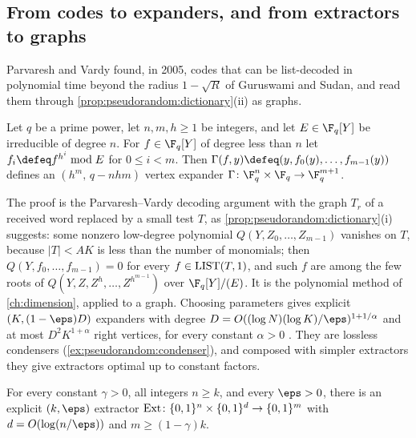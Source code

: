 \begin{refsection}
\subsection{From codes to expanders, and from extractors to graphs}\label{sec:pseudorandom:guv}

Parvaresh and Vardy found, in 2005, codes that can be list-decoded in polynomial time beyond the radius $1-\sqrt R$ of Guruswami and Sudan, and \textcite{GuruswamiUmansVadhan2009} read them through \cref{prop:pseudorandom:dictionary}(ii) as graphs.

\begin{theorem}\label{thm:pseudorandom:guv}
Let $q$ be a prime power, let $n,m,h\ge1$ be integers, and let $E\in\F_q[Y]$ be irreducible of degree $n$. For $f\in\F_q[Y]$ of degree less than $n$ let $f_i\defeq f^{h^i}\bmod E$ for $0\le i<m$. Then $\Gamma(f,y)\defeq(y,f_0(y),\dots,f_{m-1}(y))$ defines an $(h^m,\,q-nhm)$ vertex expander $\Gamma\colon\F_q^n\times\F_q\to\F_q^{m+1}$.
\end{theorem}

The proof \parencite[Theorem~5.34]{Vadhan2012} is the Parvaresh--Vardy decoding argument with the graph $T_r$ of a received word replaced by a small test $T$, as \cref{prop:pseudorandom:dictionary}(i) suggests: some nonzero low-degree polynomial $Q(Y,Z_0,\dots,Z_{m-1})$ vanishes on $T$, because $|T|<AK$ is less than the number of monomials; then $Q(Y,f_0,\dots,f_{m-1})=0$ for every $f\in\mathrm{LIST}(T,1)$, and such $f$ are among the few roots of $Q(Y,Z,Z^h,\dots,Z^{h^{m-1}})$ over $\F_q[Y]/(E)$. It is the polynomial method of \cref{ch:dimension}, applied to a graph. Choosing parameters gives explicit $(K,(1-\eps)D)$ expanders with degree $D=O((\log N)(\log K)/\eps)^{1+1/\alpha}$ and at most $D^2K^{1+\alpha}$ right vertices, for every constant $\alpha>0$ \parencite[Theorem~5.35]{Vadhan2012}. They are lossless condensers (\cref{ex:pseudorandom:condenser}), and composed with simpler extractors they give extractors optimal up to constant factors.

\begin{theorem}\label{thm:pseudorandom:guvext}
For every constant $\gamma>0$, all integers $n\ge k$, and every $\eps>0$, there is an explicit $(k,\eps)$ extractor $\operatorname{Ext}\colon\{0,1\}^n\times\{0,1\}^d\to\{0,1\}^m$ with $d=O(\log(n/\eps))$ and $m\ge(1-\gamma)k$.
\end{theorem}


\end{refsection}
